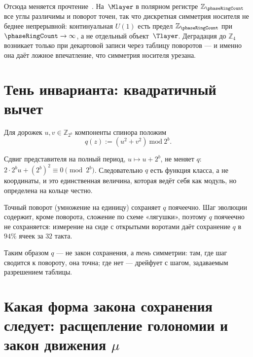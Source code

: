 \begin{remark}
\label{rem:u1-is-t-limit}
Отсюда меняется прочтение~. На~$\Mlayer$ в полярном регистре
$\mathbb{Z}_{\phaseRingCount}$ все углы различимы и поворот точен, так что дискретная
симметрия носителя не беднее непрерывной: континуальная $U(1)$ есть предел
$\mathbb{Z}_{\phaseRingCount}$ при $\phaseRingCount\to\infty$, а не отдельный объект~$\Tlayer$.
Деградация до $\mathbb{Z}_4$ возникает только при декартовой записи через таблицу
поворотов --- и именно она даёт ложное впечатление, что симметрия носителя урезана.
\end{remark}

\section{Тень инварианта: квадратичный вычет}

\begin{definition}
\label{def:ring-square}
Для дорожек $u,v\in\mathbb{Z}_{2^{b}}$ компоненты спинора положим
\[
  q(z) := (u^2+v^2)\ \mathrm{mod}\ 2^{b}.
\]
\end{definition}

\begin{proposition}
\label{prop:q-cut-free}
Сдвиг представителя на полный период, $u\mapsto u+2^{b}$, не меняет $q$:
$2\cdot2^{b}u+(2^{b})^2\equiv0\pmod{2^{b}}$.
Следовательно $q$ есть функция класса, а не координаты, и это единственная
величина, которая ведёт себя как модуль, но определена на кольце честно.
\end{proposition}

\begin{proposition}
\label{prop:q-scope}
Точный поворот (умножение на единицу) сохраняет $q$ поячеечно.
Шаг эволюции содержит, кроме поворота, сложение по схеме «лягушки»,
поэтому $q$ поячеечно не сохраняется: измерение на сиде с открытыми воротами
даёт сохранение $q$ в $94\%$ ячеек за $32$ такта.
\end{proposition}

Таким образом $q$ --- не закон сохранения, а \emph{тень} симметрии:
там, где шаг сводится к повороту, она точна; где нет --- дрейфует с шагом,
задаваемым разрешением таблицы.

\section{Какая форма закона сохранения следует: расщепление голономии и закон движения \texorpdfstring{$\mu$}{mu}}
\label{sec:holonomy-split-mu}

